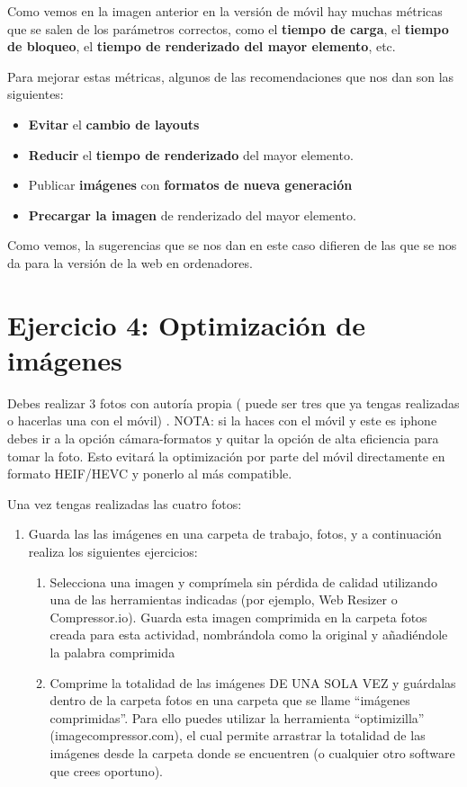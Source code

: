 \begin{itemize}
    Como vemos en la imagen anterior en la versión de móvil hay muchas métricas que se salen de los parámetros correctos, como el \textbf{tiempo de carga}, el \textbf{tiempo de bloqueo}, el \textbf{tiempo de renderizado del mayor elemento}, etc.

    Para mejorar estas métricas, algunos de las recomendaciones que nos dan son las siguientes:

    \begin{itemize}
        \item \textbf{Evitar} el \textbf{cambio de layouts}
        \item \textbf{Reducir} el \textbf{tiempo de renderizado} del mayor elemento.
        \item Publicar \textbf{imágenes} con \textbf{formatos de nueva generación}
        \item \textbf{Precargar la imagen} de renderizado del mayor elemento.
    \end{itemize}

    Como vemos, la sugerencias que se nos dan en este caso difieren de las que se nos da para la versión de la web en ordenadores.
\end{itemize}

\section{Ejercicio 4: Optimización de imágenes}
Debes realizar  3 fotos con autoría propia ( puede ser tres  que ya tengas realizadas o hacerlas una con el móvil) . NOTA: si la haces con el móvil y este es iphone debes ir a la opción cámara-formatos y quitar la opción de alta eficiencia para tomar la foto. Esto evitará la optimización por parte del móvil directamente en formato HEIF/HEVC y ponerlo al más compatible.

Una vez tengas realizadas las cuatro fotos:

\begin{enumerate}
    \item Guarda las  las imágenes en una carpeta de trabajo, fotos, y a continuación realiza los siguientes ejercicios:

    \begin{enumerate}
       \item Selecciona una imagen y comprímela sin pérdida de calidad utilizando una de las herramientas indicadas (por ejemplo, Web Resizer o Compressor.io). Guarda esta imagen comprimida en la carpeta fotos  creada para esta actividad, nombrándola como la original y añadiéndole la palabra comprimida

       \item Comprime la totalidad de las imágenes DE UNA SOLA VEZ y guárdalas dentro de la carpeta fotos en una carpeta  que se llame “imágenes comprimidas”. Para ello puedes utilizar la herramienta “optimizilla” (imagecompressor.com), el cual permite arrastrar la totalidad de las imágenes desde la carpeta donde se encuentren (o cualquier otro software que crees oportuno).
    \end{enumerate}
\end{enumerate}

